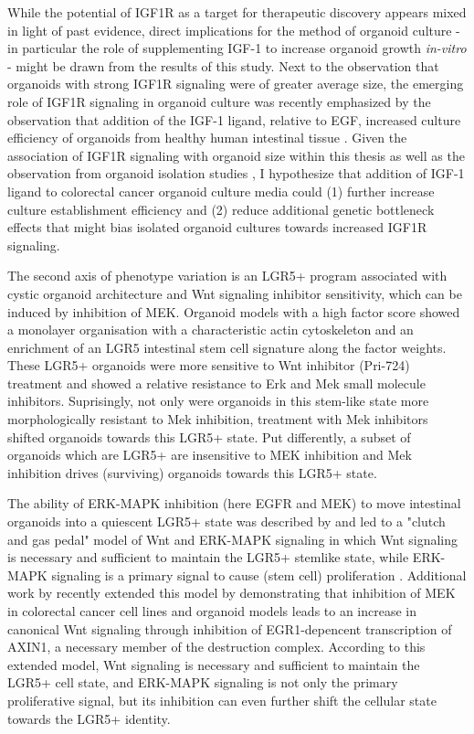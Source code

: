 \begin{flushleft}
While the potential of IGF1R as a target for therapeutic discovery appears mixed in light of past evidence, direct implications for the method of organoid culture - in particular the role of supplementing IGF-1 to increase organoid growth \textit{in-vitro} - might be drawn from the results of this study. Next to the observation that organoids with strong IGF1R signaling were of greater average size, the emerging role of IGF1R signaling in organoid culture was recently emphasized by the observation that addition of the IGF-1 ligand, relative to EGF, increased culture efficiency of organoids from healthy human intestinal tissue \citep{fujiiHumanIntestinalOrganoids2018a}. Given the association of IGF1R signaling with organoid size within this thesis as well as the observation from organoid isolation studies \citep{fujiiHumanIntestinalOrganoids2018a}, I hypothesize that addition of IGF-1 ligand to colorectal cancer organoid culture media could (1) further increase culture establishment efficiency and (2) reduce additional genetic bottleneck effects that might bias isolated organoid cultures towards increased IGF1R signaling.
\smallbreak

The second axis of phenotype variation is an LGR5+ program associated with cystic organoid architecture and Wnt signaling inhibitor sensitivity, which can be induced by inhibition of MEK. Organoid models with a high factor score showed a monolayer organisation with a characteristic actin cytoskeleton and an enrichment of an LGR5 intestinal stem cell signature along the factor weights. These LGR5+ organoids were more sensitive to Wnt inhibitor (Pri-724) treatment and showed a relative resistance to Erk and Mek small molecule inhibitors. Suprisingly, not only were organoids in this stem-like state more morphologically resistant to Mek inhibition, treatment with Mek inhibitors shifted organoids towards this LGR5+ state. Put differently, a subset of organoids which are LGR5+ are insensitive to MEK inhibition and Mek inhibition drives (surviving) organoids towards this LGR5+ state.
\par

The ability of ERK-MAPK inhibition (here EGFR and MEK) to move intestinal organoids into a quiescent LGR5+ state was described by \citep{basakInducedQuiescenceLgr52017c} and led to a "clutch and gas pedal" model of Wnt and ERK-MAPK signaling in which Wnt signaling is necessary and sufficient to maintain the LGR5+ stemlike state, while ERK-MAPK signaling is a primary signal to cause (stem cell) proliferation \citep{basakInducedQuiescenceLgr52017c}. Additional work by \citep{zhanMEKInhibitorsActivate2019a} recently extended this model by demonstrating that inhibition of MEK in colorectal cancer cell lines and organoid models leads to an increase in canonical Wnt signaling through inhibition of EGR1-depencent transcription of AXIN1, a necessary member of the destruction complex. According to this extended model, Wnt signaling is necessary and sufficient to maintain the LGR5+ cell state, and ERK-MAPK signaling is not only the primary proliferative signal, but its inhibition can even further shift the cellular state towards the LGR5+ identity. 



\end{flushleft}

